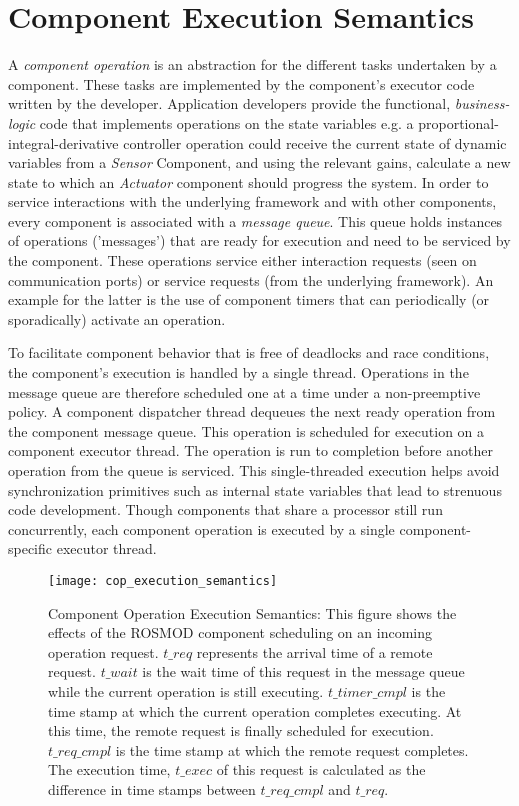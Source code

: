 \section{Component Execution Semantics}
\label{sec:ROSMOD}

A \emph{component operation} is an abstraction for the different tasks undertaken by a component. These tasks are implemented by the component's executor code written by the developer. Application developers provide the functional, \emph{business-logic} code that implements operations on the state variables e.g. a proportional-integral-derivative controller operation could receive the current state of dynamic variables from a \emph{Sensor} Component, and using the relevant gains, calculate a new state to which an \emph{Actuator} component should progress the system. In order to service interactions with the underlying framework and with other components, every component is associated with a \emph{message queue}. This queue holds instances of operations ('messages') that are ready for execution and need to be serviced by the component. These operations service either interaction requests (seen on communication ports) or service requests (from the underlying framework). An example for the latter is the use of component timers that can periodically (or sporadically) activate an operation. 

To facilitate component behavior that is free of deadlocks and race conditions, the component's execution is handled by a single thread. Operations in the message queue are therefore scheduled one at a time under a non-preemptive policy. A component dispatcher thread dequeues the next ready operation from the component message queue. This operation is scheduled for execution on a component executor thread. The operation is run to completion before another operation from the queue is serviced. This single-threaded execution helps avoid synchronization primitives such as internal state variables that lead to strenuous code development. Though components that share a processor still run concurrently, each component operation is executed by a single component-specific executor thread.

\begin{figure}[ht]
	\centering
	\texttt{[image: cop\_execution\_semantics]}
	\caption{Component Operation Execution Semantics: This figure shows the effects of the ROSMOD component scheduling on an incoming operation request. $t\_{req}$ represents the arrival time of a remote request. $t\_{wait}$ is the wait time of this request in the message queue while the current operation is still executing. $t\_{timer\_cmpl}$ is the time stamp at which the current operation completes executing. At this time, the remote request is finally scheduled for execution. $t\_{req\_cmpl}$ is the time stamp at which the remote request completes. The execution time, $t\_{exec}$ of this request is calculated as the difference in time stamps between $t\_{req\_cmpl}$ and $t\_{req}$.}
	\label{fig:cop_execution_semantics}
\end{figure}

